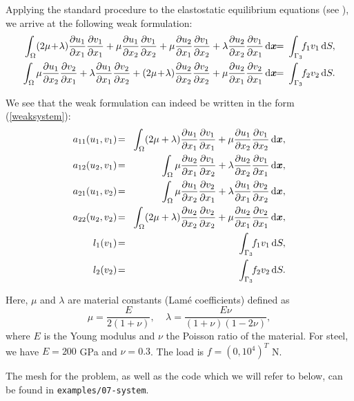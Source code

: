 Applying the standard procedure to the elastostatic equilibrium equations
(see \cite{lifshitz}), we arrive at the following weak formulation:
\begin{eqnarray*}
  \int_\Omega
    (2\mu\!+\!\lambda)\dd{u_1}{x_1}\dd{v_1}{x_1} + \mu\dd{u_1}{x_2}\dd{v_1}{x_2} +
    \mu\dd{u_2}{x_1}\dd{v_1}{x_2} + \lambda\dd{u_2}{x_2}\dd{v_1}{x_1}
    \,\mbox{d}\bfx \!\!&=&\!\!\!
    \int_{\Gamma_3} \!\!f_1 v_1 \,\mbox{d}S, \\ \smallskip
  \int_\Omega
    \mu\dd{u_1}{x_2}\dd{v_2}{x_1} + \lambda\dd{u_1}{x_1}\dd{v_2}{x_2} +
    (2\mu\!+\!\lambda)\dd{u_2}{x_2}\dd{v_2}{x_2} + \mu\dd{u_2}{x_1}\dd{v_2}{x_1}
    \,\mbox{d}\bfx \!\!&=&\!\!\!
    \int_{\Gamma_3} \!\!f_2 v_2 \,\mbox{d}S.
\end{eqnarray*}

We see that the weak formulation can indeed be written in the form (\ref{weaksystem}):
\begin{eqnarray}
  a_{11}(u_1, v_1) \!&=&\! \int_\Omega (2\mu+\lambda)\dd{u_1}{x_1}\dd{v_1}{x_1} + \mu\dd{u_1}{x_2}\dd{v_1}{x_2} \,\mbox{d}\bfx, \label{sysform1} \\
  a_{12}(u_2, v_1) \!&=&\! \int_\Omega \mu\dd{u_2}{x_1}\dd{v_1}{x_2} + \lambda\dd{u_2}{x_2}\dd{v_1}{x_1} \,\mbox{d}\bfx,\\
  a_{21}(u_1, v_2) \!&=&\! \int_\Omega \mu\dd{u_1}{x_2}\dd{v_2}{x_1} + \lambda\dd{u_1}{x_1}\dd{v_2}{x_2} \,\mbox{d}\bfx,\\
  a_{22}(u_2, v_2) \!&=&\! \int_\Omega (2\mu+\lambda)\dd{u_2}{x_2}\dd{v_2}{x_2} + \mu\dd{u_2}{x_1}\dd{v_2}{x_1} \,\mbox{d}\bfx, \label{sysform2} \\
  l_{1}(v_1) \!&=&\!
  \int_{\Gamma_3} \!\!f_1 v_1 \,\mbox{d}S, \\
  l_{2}(v_2) \!&=&\!
  \int_{\Gamma_3} \!\!f_2 v_2 \,\mbox{d}S.  \label{sysform3} 
\end{eqnarray}

Here, $\mu$ and $\lambda$ are material constants (Lam\'e coefficients) defined as
$$\mu = \frac{E}{2(1+\nu)}, \ \ \ \ \  \lambda = \frac{E\nu}{(1+\nu)(1-2\nu)},$$
where $E$ is the Young modulus and $\nu$ the Poisson ratio of the material. For
steel, we have $E = 200$ GPa and $\nu = 0.3$. The load is $f = (0, 10^4)^T$ N.

The mesh for the problem, as well as the code which we will refer to below,
can be found in \verb"examples/07-system".

